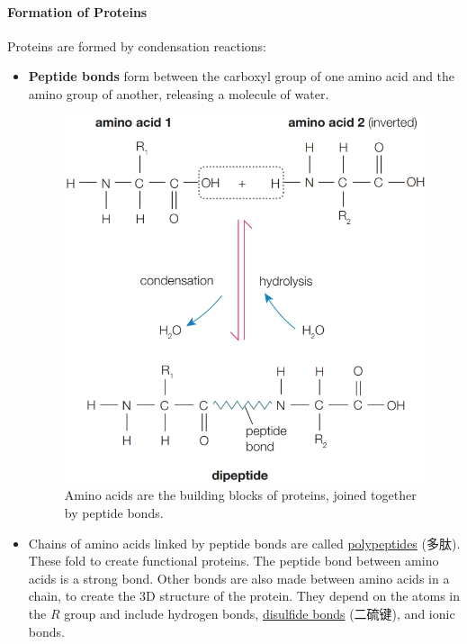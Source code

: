 \paragraph{Formation of Proteins}
Proteins are formed by condensation reactions:
\begin{itemize}
    \item \textbf{Peptide bonds} form between the carboxyl group of one amino acid and the amino group of another, releasing a
    molecule of water.
    \begin{figure}[H]
        \centering
        \includegraphics[scale=0.35]{Biology/1A/Images/1A-5-2.png}
        \caption{Amino acids are the building blocks of proteins, joined together by peptide bonds.}
    \end{figure}
    \item Chains of amino acids linked by peptide bonds are called \underline{polypeptides} (多肽). These fold to create
    functional proteins. The peptide bond between amino acids is a strong bond. Other bonds are also made between amino acids in
    a chain, to create the 3D structure of the protein. They depend on the atoms in the $R$ group and include hydrogen bonds,
    \underline{disulfide bonds} (二硫键), and ionic bonds.
    \begin{figure}[H]
        \centering

\end{figure}
\end{itemize}
